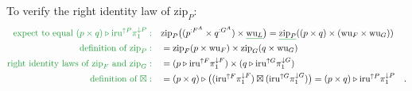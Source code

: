 To verify the right identity law of $\text{zip}_{P}$:
\begin{align*}
{\color{greenunder}\text{expect to equal }(p\times q)\triangleright\text{iru}^{\uparrow P}\pi_{1}^{\downarrow P}:}\quad & \text{zip}_{P}\big((p^{:F^{A}}\times q^{:G^{A}})\times\gunderline{\text{wu}_{L}}\big)=\gunderline{\text{zip}_{P}}((p\times q)\times(\text{wu}_{F}\times\text{wu}_{G}))\\
{\color{greenunder}\text{definition of }\text{zip}_{P}:}\quad & =\text{zip}_{F}(p\times\text{wu}_{F})\times\text{zip}_{G}(q\times\text{wu}_{G})\\
{\color{greenunder}\text{right identity laws of }\text{zip}_{F}\text{ and }\text{zip}_{G}:}\quad & =(p\triangleright\text{iru}^{\uparrow F}\pi_{1}^{\downarrow F})\times(q\triangleright\text{iru}^{\uparrow G}\pi_{1}^{\downarrow G})\\
{\color{greenunder}\text{definition of }\boxtimes:}\quad & =(p\times q)\triangleright\big((\text{iru}^{\uparrow F}\pi_{1}^{\downarrow F})\boxtimes(\text{iru}^{\uparrow G}\pi_{1}^{\downarrow G})\big)=(p\times q)\triangleright\text{iru}^{\uparrow P}\pi_{1}^{\downarrow P}\quad.
\end{align*}

